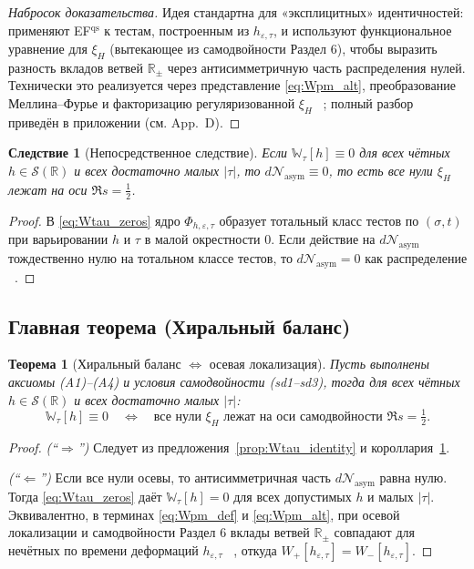 \documentclass{article}
\numberwithin{equation}{section}
\theoremstyle{plain}
\newtheorem{theorem}{Теорема}
\newtheorem{corollary}{Следствие}
\theoremstyle{definition}
\theoremstyle{remark}
\def\Rightarrow{⇒}%
\def\Leftarrow{⇐}%
\begin{document}
\begin{proof}[Набросок доказательства]
Идея стандартна для «эксплицитных» идентичностей: применяют EF$^{\mathrm{qs}}$
к тестам, построенным из $h_{\varepsilon,\tau}$, и используют функциональное уравнение для $\xi_H$
(вытекающее из самодвойности Раздел 6), чтобы выразить разность вкладов ветвей $\mathbb R_\pm$
через антисимметричную часть распределения нулей. Технически это реализуется через
представление \eqref{eq:Wpm_alt}, преобразование Меллина–Фурье и факторизацию
регуляризованной $\xi_H$ ~\cite{Burnol2002}; полный разбор приведён в приложении (см. App.~D).
\end{proof}

\begin{corollary}[Непосредственное следствие]
\label{cor:Wtau_zero_equiv}
Если $\mathbb W_\tau[h]\equiv 0$ для всех чётных $h\in\mathcal S(\mathbb R)$ и всех достаточно малых $|\tau|$,
то $d\mathcal N_{\mathrm{asym}}\equiv 0$, то есть все нули $\xi_H$ лежат на оси $\Re s=\tfrac12$.
\end{corollary}

\begin{proof}
В \eqref{eq:Wtau_zeros} ядро $\Phi_{h,\varepsilon,\tau}$ образует тотальный класс тестов по $(\sigma,t)$
при варьировании $h$ и $\tau$ в малой окрестности $0$. Если действие на $d\mathcal N_{\mathrm{asym}}$
тождественно нулю на тотальном классе тестов, то $d\mathcal N_{\mathrm{asym}}=0$ как распределение ~\cite{Yosida1980}.
\end{proof}

\subsection{Главная теорема (Хиральный баланс)}

\begin{theorem}[Хиральный баланс $\Longleftrightarrow$ осевая локализация]
\label{thm:balance_axis}
Пусть выполнены аксиомы (A1)–(A4) и условия самодвойности (sd1–sd3), тогда для всех чётных $h\in\mathcal S(\mathbb R)$ и всех достаточно малых $|\tau|$:
\begin{equation}
\label{eq:balance_axis_equiv}
\mathbb W_\tau[h]\equiv 0
\quad\Longleftrightarrow\quad
\text{все нули $\xi_H$ лежат на оси самодвойности } \Re s=\tfrac12.
\end{equation}
\end{theorem}

\begin{proof}
\emph{(``$\Rightarrow$'')} Следует из предложения~\ref{prop:Wtau_identity} и короллария~\ref{cor:Wtau_zero_equiv}.

\emph{(``$\Leftarrow$'')} Если все нули осевы, то антисимметричная часть $d\mathcal N_{\mathrm{asym}}$ равна нулю.
Тогда \eqref{eq:Wtau_zeros} даёт $\mathbb W_\tau[h]=0$ для всех допустимых $h$ и малых $|\tau|$.
Эквивалентно, в терминах \eqref{eq:Wpm_def} и \eqref{eq:Wpm_alt}, при осевой локализации и самодвойности Раздел 6
вклады ветвей $\mathbb R_\pm$ совпадают для нечётных по времени деформаций $h_{\varepsilon,\tau}$ ~\cite{LaxPhillips1976}, откуда
$W_+[h_{\varepsilon,\tau}]=W_-[h_{\varepsilon,\tau}]$.
\end{proof}
\end{document}
